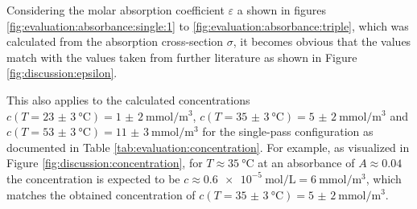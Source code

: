 Considering the molar absorption coefficient $\varepsilon$ a shown in figures \ref{fig:evaluation:absorbance:single:1} to \ref{fig:evaluation:absorbance:triple}, which was calculated from the absorption cross-section $\sigma$, it becomes obvious that the values match with the values taken from further literature as shown in Figure \ref{fig:discussion:epsilon}.

This also applies to the calculated concentrations $c(T = \SI{23(3)}{\celsius}) = \SI{1(2)}{\milli\mol\per\m^3}$, $c(T = \SI{35(3)}{\celsius}) = \SI{5(2)}{\milli\mol\per\m^3}$ and $c(T = \SI{53(3)}{\celsius}) = \SI{11(3)}{\milli\mol\per\m^3}$ for the single-pass configuration as documented in Table \ref{tab:evaluation:concentration}. For example, as visualized in Figure \ref{fig:discussion:concentration}, for $T \approx \SI{35}{\celsius}$ at an absorbance of $A \approx 0.04$ the concentration is expected to be $c \approx \SI{0.6e-5}{\mol\per\liter} = \SI{6}{\milli\mol\per\m^3}$, which matches the obtained concentration of $c(T = \SI{35(3)}{\celsius}) = \SI{5(2)}{\milli\mol\per\m^3}$.

